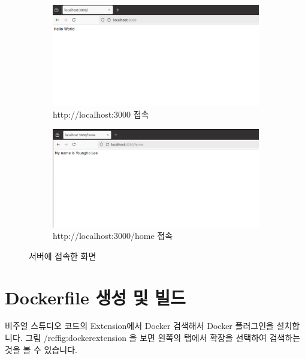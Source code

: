\documentclass{article}
\begin{document}
\begin{figure}[htb]
  \centering
  \begin{subfigure}[t]{0.8\textwidth} %
      \centering
      \includegraphics[width=\textwidth]{images/localhost.png} %
      \caption{http://localhost:3000 접속} %
      \label{fig:first} %
  \end{subfigure}
  
  \vspace{0.5cm} %

  \begin{subfigure}[t]{0.8\textwidth} %
      \centering
      \includegraphics[width=\textwidth]{images/localhome.png} %
      \caption{http://localhost:3000/home 접속} %
      \label{fig:second} %
  \end{subfigure}

  \caption{서버에 접속한 화면} %
  \label{fig:stacked} %
\end{figure}

\clearpage

\section{Dockerfile 생성 및 빌드}
비주얼 스튜디오 코드의 Extension에서 Docker 검색해서 Docker 플러그인을 설치합니다. 그림 /ref{fig:dockerextension} 을 보면 왼쪽의 탭에서 확장을 선택하여 검색하는 것을 볼 수 있습니다. 
\end{document}
